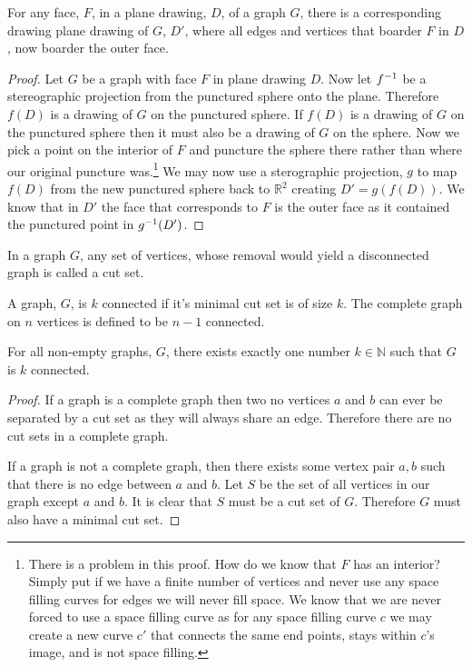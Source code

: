 \documentclass{article}
\begin{document}
\begin{lemma} \label{outside}
	For any face, $F$, in a plane drawing, $D$, of a graph $G$, there is a corresponding drawing plane drawing of $G$, $D'$, where all edges and vertices that boarder $F$ in $D$, now boarder the outer face.
\end{lemma}
\begin{proof}
	Let $G$ be a graph with face $F$ in plane drawing $D$. Now let ${f}^{-1}$ be a stereographic projection from the punctured sphere onto the plane. Therefore $f(D)$ is a drawing of $G$ on the punctured sphere. If $f(D)$ is a drawing of $G$ on the punctured sphere then it must also be a drawing of $G$ on the sphere. Now we pick a point on the interior of $F$ and puncture the sphere there rather than where our original puncture was.\footnote{There is a problem in this proof. How do we know that $F$ has an interior? Simply put if we have a finite number of vertices and never use any space filling curves for edges we will never fill space. We know that we are never forced to use a space filling curve as for any space filling curve $c$ we may create a new curve $c'$ that connects the same end points, stays within $c$'s image, and is not space filling. %
	} We may now use a sterographic projection, $g$ to map $f(D)$ from the new punctured sphere back to $\mathbb R^2$ creating $D' = g(f(D))$. We know that in $D'$ the face that corresponds to $F$ is the outer face as it contained the punctured point in ${g}^{-1}(D')$. %
\end{proof}

\begin{definition}
	In a graph $G$, any set of vertices, whose removal would yield a disconnected graph is called a cut set.
\end{definition}

\begin{definition}[$k$ connected]
	A graph, $G$, is $k$ connected if it's minimal cut set is of size $k$. The complete graph on $n$ vertices is defined to be $n-1$ connected.
\end{definition}

\begin{lemma}
	For all non-empty graphs, $G$, there exists exactly one number $k\in\mathbb N$ such that $G$ is $k$ connected.
\end{lemma}
\begin{proof}
	If a graph is a complete graph then two no vertices $a$ and $b$ can ever be separated by a cut set as they will always share an edge. Therefore there are no cut sets in a complete graph.
	
	If a graph is not a complete graph, then there exists some vertex pair $a,b$ such that there is no edge between $a$ and $b$. Let $S$ be the set of all vertices in our graph except $a$ and $b$. It is clear that $S$ must be a cut set of $G$. Therefore $G$ must also have a minimal cut set.
\end{proof}
\end{document}
